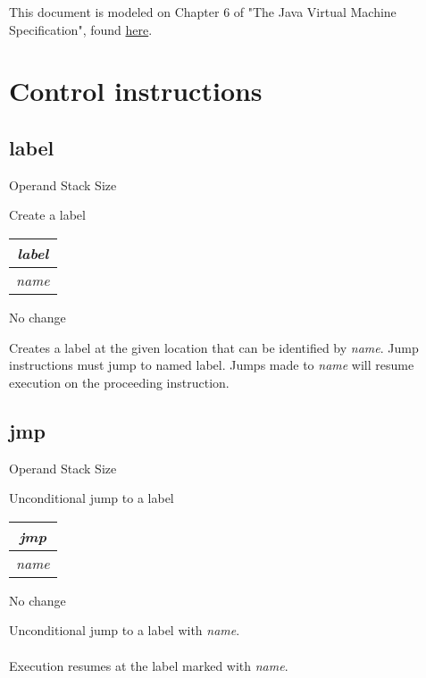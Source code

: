 \documentclass[12pt]{article}
\begin{document}
	This document is modeled on Chapter 6 of "The Java Virtual Machine Specification", found \href{http://docs.oracle.com/javase/specs/jvms/se8/jvms8.pdf}{here}.
	\tableofcontents

	\newpage
	
	\section{Control instructions}
		\subsection*{label}
			\begin{labeling}{Operand Stack Size}
				\item [\textbf{Operation}] Create a label
				\item [\textbf{Format}] \begin{tabular}{| c |} \hline \textit{label} \\ \hline \textit{name} \\ \hline \end{tabular}
				\item [\textbf{Operand Stack}] No change
				\item [\textbf{Description}] 	Creates a label at the given location that can be identified by \textit{name}. Jump instructions must jump to named label. Jumps made to \textit{name} will resume execution on the proceeding instruction. 
			\end{labeling}
		\newpage 
		
		\subsection*{jmp}
			\begin{labeling}{Operand Stack Size}
				\item [\textbf{Operation}] Unconditional jump to a label
				\item [\textbf{Format}] \begin{tabular}{| c |} \hline \textit{jmp} \\ \hline \textit{name} \\ \hline \end{tabular}
				\item [\textbf{Operand Stack}] No change
				\item [\textbf{Description}] 	Unconditional jump to a label with \textit{name}. \\ \\ 
				Execution resumes at the label marked with \textit{name}.
			\end{labeling}
		\newpage
		
\end{document}
